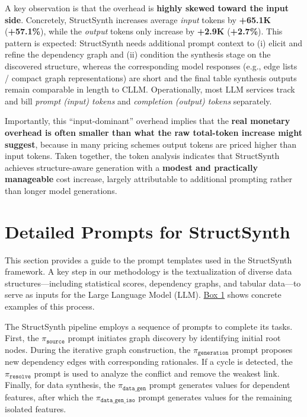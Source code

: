 A key observation is that the overhead is \textbf{highly skewed toward the input side}. Concretely, \textsf{StructSynth} increases average \emph{input} tokens by \textbf{+65.1K} (\textbf{+57.1\%}), while the \emph{output} tokens only increase by \textbf{+2.9K} (\textbf{+2.7\%}). This pattern is expected: \textsf{StructSynth} needs additional prompt context to (i) elicit and refine the dependency graph and (ii) condition the synthesis stage on the discovered structure, whereas the corresponding model responses (e.g., edge lists / compact graph representations) are short and the final table synthesis outputs remain comparable in length to \textsc{CLLM}. Operationally, most LLM services track and bill \emph{prompt (input) tokens} and \emph{completion (output) tokens} separately.

Importantly, this “input-dominant” overhead implies that the \textbf{real monetary overhead is often smaller than what the raw total-token increase might suggest}, because in many pricing schemes output tokens are priced higher than input tokens. Taken together, the token analysis indicates that \textsf{StructSynth} achieves structure-aware generation with a \textbf{modest and practically manageable} cost increase, largely attributable to additional prompting rather than longer model generations.







\section{Detailed Prompts for StructSynth}
\label{app:prompts}
This section provides a guide to the prompt templates used in the StructSynth framework. A key step in our methodology is the textualization of diverse data structures---including statistical scores, dependency graphs, and tabular data---to serve as inputs for the Large Language Model (LLM). \hyperref[box:textualization_examples]{Box 1} shows concrete examples of this process. 

The StructSynth pipeline employs a sequence of prompts to complete its tasks. First, the \hyperref[prompt:source]{\texttt{$\pi_\mathtt{source}$}} prompt initiates graph discovery by identifying initial root nodes. During the iterative graph construction, the \hyperref[prompt:generation]{\texttt{$\pi_\mathtt{generation}$}} prompt proposes new dependency edges with corresponding rationales. If a cycle is detected, the \hyperref[prompt:resolve]{\texttt{$\pi_\mathtt{resolve}$}} prompt is used to analyze the conflict and remove the weakest link. Finally, for data synthesis, the \hyperref[prompt:data_gen]{\texttt{$\pi_\mathtt{data\_gen}$}} prompt generates values for dependent features, after which the \hyperref[prompt:data_gen_iso]{\texttt{$\pi_\mathtt{data\_gen\_iso}$}} prompt generates values for the remaining isolated features.


